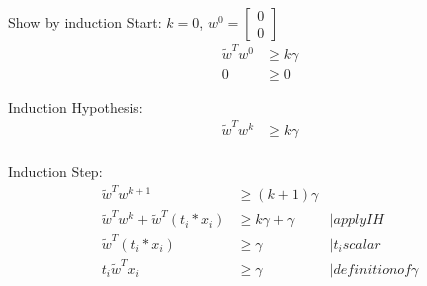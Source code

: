Show by induction
Start:
$k = 0 $,
$w^0 = \begin{bmatrix}
	0\\0
\end{bmatrix}$\\
\begin{align*}
	\tilde{w}^T w^0 &\geq k \gamma\\
	0 &\geq 0
\end{align*}

Induction Hypothesis:
\begin{align*}
 \tilde{w}^T w^{k} &\geq {k} \gamma\\
\end{align*}

Induction Step:
\begin{align*}
\tilde{w}^T w^{k+1} &\geq (k+1) \gamma\\
\tilde{w}^T w^{k}+\tilde{w}^T (t_i*x_i) &\geq {k} \gamma +\gamma &| apply IH \\
\tilde{w}^T (t_i*x_i) &\geq \gamma &| t_i scalar\\
t_i \tilde{w}^T x_i &\geq \gamma &| definition of \gamma\\
\end{align*}